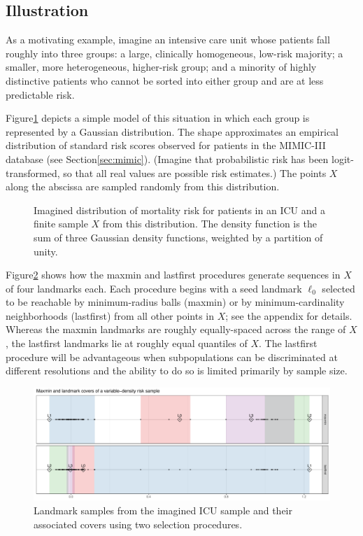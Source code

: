 \documentclass[
]{article}
\begin{document}
\hypertarget{illustration}{%
\subsection{Illustration}\label{illustration}}

As a motivating example, imagine an intensive care unit whose patients
fall roughly into three groups: a large, clinically homogeneous,
low-risk majority; a smaller, more heterogeneous, higher-risk group; and
a minority of highly distinctive patients who cannot be sorted into
either group and are at less predictable risk.

Figure\nbs\ref{fig:icu-density} depicts a simple model of this situation
in which each group is represented by a Gaussian distribution. The shape
approximates an empirical distribution of standard risk scores observed
for patients in the MIMIC-III database (see Section\nbs\ref{sec:mimic}).
(Imagine that probabilistic risk has been logit-transformed, so that all
real values are possible risk estimates.) The points \(X\) along the
abscissa are sampled randomly from this distribution.

\begin{figure}
\caption{
Imagined distribution of mortality risk for patients in an ICU and a finite sample $X$ from this distribution.
The density function is the sum of three Gaussian density functions, weighted by a partition of unity.
\label{fig:icu-density}
}
\end{figure}

Figure\nbs\ref{fig:icu-cover} shows how the maxmin and lastfirst
procedures generate sequences in \(X\) of four landmarks each. Each
procedure begins with a seed landmark \(\ell_0\) selected to be
reachable by minimum-radius balls (maxmin) or by minimum-cardinality
neighborhoods (lastfirst) from all other points in \(X\); see the
appendix for details. Whereas the maxmin landmarks are roughly
equally-spaced across the range of \(X\), the lastfirst landmarks lie at
roughly equal quantiles of \(X\). The lastfirst procedure will be
advantageous when subpopulations can be discriminated at different
resolutions and the ability to do so is limited primarily by sample
size.

\begin{figure}
\includegraphics[width=\textwidth]{../figures/vardens-cover}
\caption{
Landmark samples from the imagined ICU sample and their associated covers using two selection procedures.
\label{fig:icu-cover}
}
\end{figure}
\end{document}
